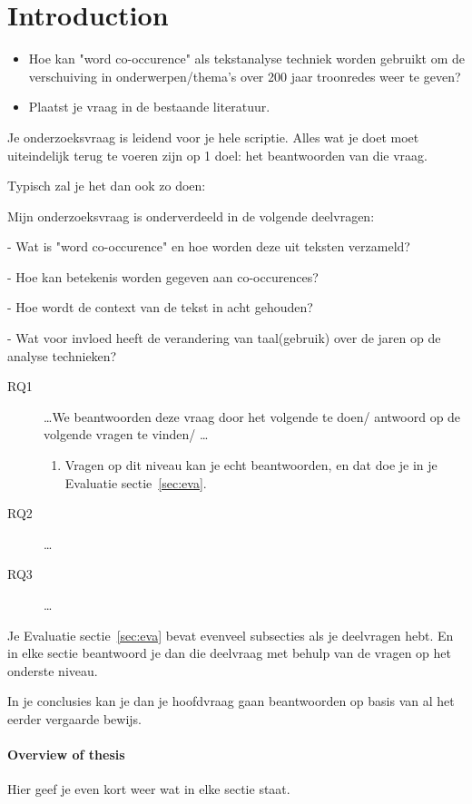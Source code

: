 \section{Introduction}
\label{sec:intro}
\begin{itemize}
\item Hoe kan "word co-occurence" als tekstanalyse techniek worden gebruikt om de verschuiving in onderwerpen/thema's over 200 jaar troonredes weer te geven?
\item Plaatst je vraag in de bestaande literatuur.
\end{itemize}

Je onderzoeksvraag is leidend voor je hele scriptie. Alles wat je doet moet uiteindelijk terug te voeren zijn op 1 doel: het beantwoorden van die vraag. 

Typisch zal je het dan ook zo doen:

Mijn onderzoeksvraag is onderverdeeld in de volgende deelvragen:

- Wat is "word co-occurence" en hoe worden deze uit teksten verzameld?

- Hoe kan betekenis worden gegeven aan co-occurences?

- Hoe wordt de context van de tekst in acht gehouden?

- Wat voor invloed heeft de verandering van taal(gebruik) over de jaren op de analyse technieken?


\begin{description}
\item[RQ1] \ldots We   beantwoorden deze vraag  door het volgende te doen/ antwoord op de volgende vragen te vinden/ \ldots
\begin{enumerate}
\item Vragen op dit niveau kan je echt beantwoorden, en dat doe je in je Evaluatie sectie~\ref{sec:eva}.
\end{enumerate}
\item[RQ2] \ldots
\item[RQ3] \ldots
\end{description}

Je Evaluatie sectie~\ref{sec:eva} bevat evenveel subsecties als je deelvragen hebt. En in elke sectie beantwoord je dan die deelvraag met behulp van de vragen op het onderste niveau.

In je conclusies kan je dan je hoofdvraag gaan beantwoorden op basis van al het eerder vergaarde bewijs.


\paragraph{Overview of thesis}
Hier geef je even kort weer wat in elke sectie staat.